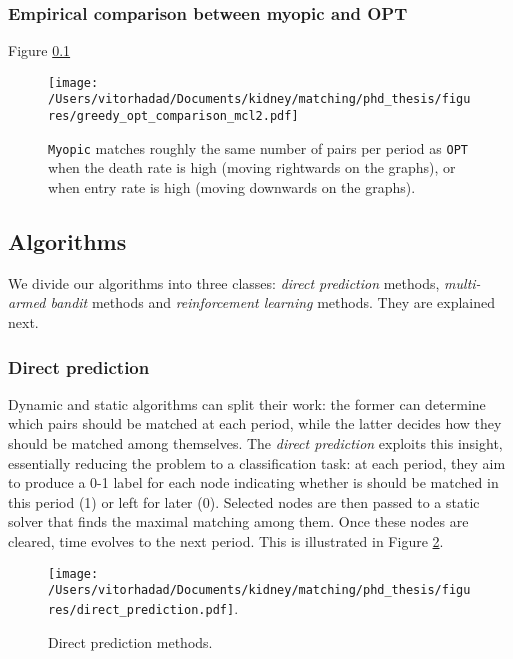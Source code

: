 \documentclass[12pt]{article}
\begin{document}
\subsubsection{Empirical comparison between myopic and OPT}

Figure \ref{}



 \begin{figure}
 \centering
 \hspace*{-4cm}
 \texttt{[image: /Users/vitorhadad/Documents/kidney/matching/phd\_thesis/figures/greedy\_opt\_comparison\_mcl2.pdf]}
 \caption{\texttt{Myopic} matches roughly the same number of pairs per period as \texttt{OPT} when the death rate is high (moving rightwards on the graphs), or when entry rate is high (moving downwards on the graphs).}
 \label{fig:mab}
 \end{figure}



\subsection{Algorithms}

We divide our algorithms into three classes: \emph{direct prediction} methods, \emph{multi-armed bandit} methods and \emph{reinforcement learning} methods. They are explained next.

\subsubsection{Direct prediction} \label{subsubsec:direct_prediction}

Dynamic and static algorithms can split their work: the former can determine which pairs should be matched at each period, while the latter decides how they should be matched among themselves. The \emph{direct prediction} exploits this insight, essentially reducing the problem to a classification task: at each period, they aim to produce a 0-1 label for each node indicating whether is should be matched in this period (1) or left for later (0). Selected nodes are then passed to a static solver that finds the maximal matching among them. Once these nodes are cleared, time evolves to the next period. This is illustrated in Figure \ref{fig:direct_prediction}.

\begin{figure}
\centering
\hspace*{-1cm}
\texttt{[image: /Users/vitorhadad/Documents/kidney/matching/phd\_thesis/figures/direct\_prediction.pdf]}.
\caption{Direct prediction methods.}
\label{fig:direct_prediction}
\end{figure}
\end{document}
